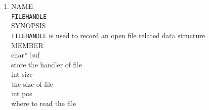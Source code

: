\documentclass{swfcthesis}
\begin{document}
\begin{enumerate}
\item
  NAME \\
  \hspace*{1cm}\texttt{FILEHANDLE} \\
  SYNOPSIS \\
  \hspace*{1cm} \texttt{FILEHANDLE} is used to record an open file related data structure\\
  MEMBER \\
  \hspace*{1cm} char* buf\\
  \hspace*{1.5cm}  store the handler of file\\
  \hspace*{1cm} int size\\
  \hspace*{1.5cm} the size of file\\
  \hspace*{1cm} int pos\\
  \hspace*{1.5cm} where to read the file\\


\end{enumerate}
\end{document}
